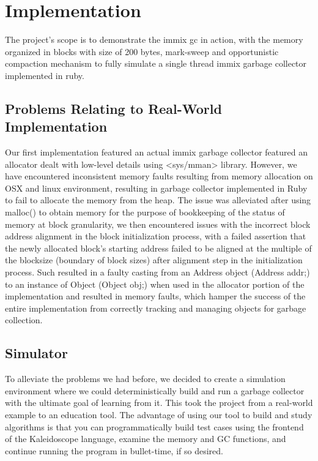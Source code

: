 \documentclass{article}
\begin{document}
  \section{Implementation}
  The project’s scope is to demonstrate the immix gc in action, with the memory
  organized in blocks with size of 200 bytes, mark-sweep and opportunistic
  compaction mechanism to fully simulate a single thread immix garbage collector
  implemented in ruby.

  \subsection{Problems Relating to Real-World Implementation}
  Our first implementation featured an actual immix garbage collector featured
  an allocator dealt with low-level details using <sys/mman> library. However,
  we have encountered inconsistent memory faults resulting from memory
  allocation on OSX and linux environment, resulting in garbage collector
  implemented in Ruby to fail to allocate the memory from the heap. The issue
  was alleviated after using malloc() to obtain memory for the purpose of
  bookkeeping of the status of memory at block granularity, we then encountered
  issues with the incorrect block address alignment in the block initialization
  process, with a failed assertion that the newly allocated block's starting
  address failed to be aligned at the multiple of the blocksize (boundary of
  block sizes) after alignment step in the initialization process. Such resulted
  in a faulty casting from an Address object (Address addr;) to an instance of
  Object (Object obj;) when used in the allocator portion of the implementation
  and resulted in memory faults, which hamper the success of the entire
  implementation from correctly tracking and managing objects for garbage
  collection.

  \subsection{Simulator}
  To alleviate the problems we had before, we decided to create a simulation
  environment where we could deterministically build and run a garbage collector
  with the ultimate goal of learning from it. This took the project from a
  real-world example to an education tool. The advantage of using our tool to
  build and study algorithms is that you can programmatically build test cases
  using the frontend of the Kaleidoscope language, examine the memory and GC
  functions, and continue running the program in bullet-time, if so desired. \\
\end{document}
